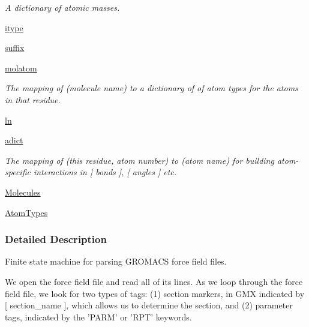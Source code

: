 \begin{DoxyCompactItemize}
\begin{DoxyCompactList}\small\item\em \-A dictionary of atomic masses. \end{DoxyCompactList}\item 
\hyperlink{classforcebalance_1_1gmxio_1_1ITP__Reader_a4b9a75f9c96a86fc99969ae97ae08dc2}{itype}
\item 
\hyperlink{classforcebalance_1_1gmxio_1_1ITP__Reader_ab35c32e7ecf74028641613f90906bd37}{suffix}
\item 
\hyperlink{classforcebalance_1_1gmxio_1_1ITP__Reader_a5ed800499e9442adaea0cee243960f94}{molatom}
\begin{DoxyCompactList}\small\item\em \-The mapping of (molecule name) to a dictionary of of atom types for the atoms in that residue. \end{DoxyCompactList}\item 
\hyperlink{classforcebalance_1_1BaseReader_a80c8e3bea212600742968aa8669e557b}{ln}
\item 
\hyperlink{classforcebalance_1_1BaseReader_a2c46ad6b66cf09a30e917ce4a1997e2a}{adict}
\begin{DoxyCompactList}\small\item\em \-The mapping of (this residue, atom number) to (atom name) for building atom-\/specific interactions in \mbox{[} bonds \mbox{]}, \mbox{[} angles \mbox{]} etc. \end{DoxyCompactList}\item 
\hyperlink{classforcebalance_1_1BaseReader_a4369b5fb663a83b11602daa71db6862e}{\-Molecules}
\item 
\hyperlink{classforcebalance_1_1BaseReader_a69ca7d949a4a3df4d9f61e617fe0e270}{\-Atom\-Types}
\end{DoxyCompactItemize}


\subsubsection{\-Detailed \-Description}
\-Finite state machine for parsing \-G\-R\-O\-M\-A\-C\-S force field files. 

\-We open the force field file and read all of its lines. \-As we loop through the force field file, we look for two types of tags\-: (1) section markers, in \-G\-M\-X indicated by \mbox{[} section\-\_\-name \mbox{]}, which allows us to determine the section, and (2) parameter tags, indicated by the '\-P\-A\-R\-M' or '\-R\-P\-T' keywords.

